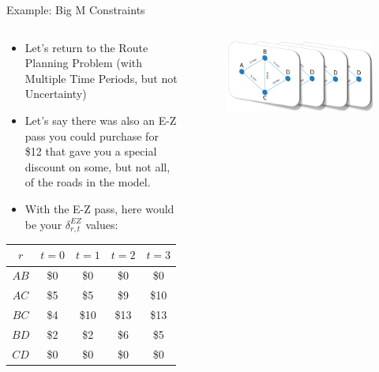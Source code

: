 \documentclass[10pt, aspectratio=169]{beamer}
\begin{document}
\begin{frame}{Example: Big M Constraints}
    \begin{columns}
        \begin{column}{0.5\textwidth}
            \begin{itemize}
                \item Let's return to the Route Planning Problem (with Multiple Time Periods, but not Uncertainty)
                \item Let's say there was also an E-Z pass you could purchase for \$12 that gave you a special discount on some, but not all, of the roads in the model.
                \item With the E-Z pass, here would be your $\delta^{EZ}_{r,t}$ values:
            \end{itemize}
            \begin{tabular}{|c||c|c|c|c|}
                \hline
                $r$ & $t=0$ & $t=1$ & $t=2$ & $t=3$ \\
                \hline \hline
                $AB$ & \$0 & \$0 & \$0 & \$0\\
                \hline
                $AC$ & \$5 & \$5 & \$9 & \$10\\
                \hline
                $BC$ & \$4 & \$10 & \$13 & \$13\\
                \hline
                $BD$ & \$2 & \$2 & \$6 & \$5\\
                \hline
                $CD$ & \$0 & \$0 & \$0 & \$0\\
                \hline
            \end{tabular}
        \end{column}
        \begin{column}{0.5\textwidth}
            \begin{figure}
                \includegraphics[width=\linewidth]{RoutePlanningProblemRepeated.png}

\end{figure}
\end{column}
\end{columns}
\end{frame}
\end{document}
